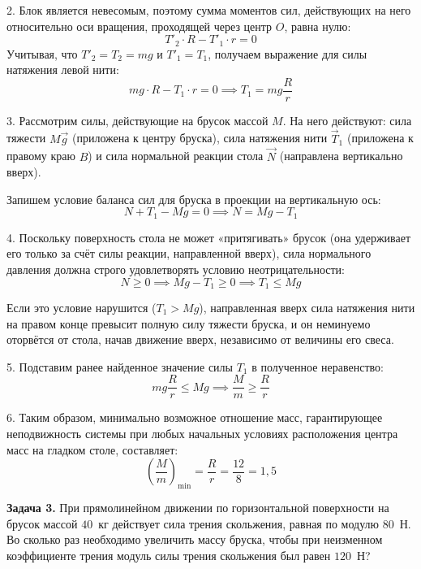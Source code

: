 \begin{taskadvanced}[code={\label{task:mechanics_v9_n26_fixed}}]
\begin{solutionbox}
2. Блок является невесомым, поэтому сумма моментов сил, действующих на него относительно оси вращения, проходящей через центр $O$, равна нулю:
$$T'_2 \cdot R - T'_1 \cdot r = 0$$
Учитывая, что $T'_2 = T_2 = mg$ и $T'_1 = T_1$, получаем выражение для силы натяжения левой нити:
$$mg \cdot R - T_1 \cdot r = 0 \implies T_1 = mg \frac{R}{r}$$

3. Рассмотрим силы, действующие на брусок массой $M$. На него действуют: сила тяжести $M\vec{g}$ (приложена к центру бруска), сила натяжения нити $\vec{T}_1$ (приложена к правому краю $B$) и сила нормальной реакции стола $\vec{N}$ (направлена вертикально вверх).

Запишем условие баланса сил для бруска в проекции на вертикальную ось:
$$N + T_1 - Mg = 0 \implies N = Mg - T_1$$

4. Поскольку поверхность стола не может «притягивать» брусок (она удерживает его только за счёт силы реакции, направленной вверх), сила нормального давления должна строго удовлетворять условию неотрицательности:
$$N \ge 0 \implies Mg - T_1 \ge 0 \implies T_1 \le Mg$$

Если это условие нарушится ($T_1 > Mg$), направленная вверх сила натяжения нити на правом конце превысит полную силу тяжести бруска, и он неминуемо оторвётся от стола, начав движение вверх, независимо от величины его свеса.

5. Подставим ранее найденное значение силы $T_1$ в полученное неравенство:
$$mg \frac{R}{r} \le Mg \implies \frac{M}{m} \ge \frac{R}{r}$$

6. Таким образом, минимально возможное отношение масс, гарантирующее неподвижность системы при любых начальных условиях расположения центра масс на гладком столе, составляет:
$$\left(\frac{M}{m}\right)_{\text{min}} = \frac{R}{r} = \frac{12}{8} = 1{,}5$$
\end{solutionbox}


\end{taskadvanced}
\begin{taskbasic}[code={\label{task:mechanics_v10_n22_fixed}}]
\textbf{Задача 3.} При прямолинейном движении по горизонтальной поверхности на брусок массой $40$~кг действует сила трения скольжения, равная по модулю $80$~Н. Во сколько раз необходимо увеличить массу бруска, чтобы при неизменном коэффициенте трения модуль силы трения скольжения был равен $120$~Н?

\end{taskbasic}


